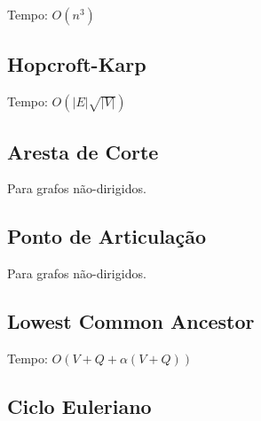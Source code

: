 \documentclass[12pt,a4paper]{article}
\begin{document}
				Tempo: \( O(n^3) \)
				
		\subsection{Hopcroft-Karp}
			Tempo: \( O(|E| \sqrt{|V|})\)
			
		\subsection{Aresta de Corte}
			Para grafos não-dirigidos.
			
		\subsection{Ponto de Articulação}
			Para grafos não-dirigidos.
			
		\subsection{Lowest Common Ancestor}
			Tempo: \( O(V + Q + \alpha(V + Q)) \)
			
		\subsection{Ciclo Euleriano}
			
\end{document}
